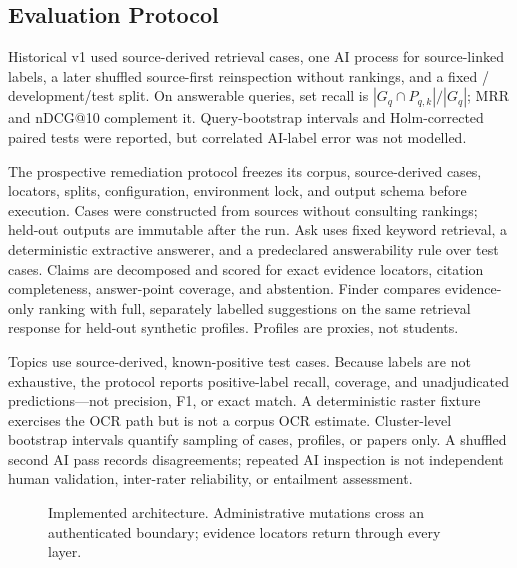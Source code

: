 \documentclass[conference,letterpaper]{IEEEtran}
\begin{document}
\subsection{Evaluation Protocol}
Historical v1 used \PaperRetrievalCaseCount{} source-derived retrieval cases, one AI process for source-linked labels, a later shuffled source-first reinspection without rankings, and a fixed \PaperRetrievalDevCount{}/\PaperRetrievalTestCount{} development/test split. On answerable queries, set recall is $|G_q\cap P_{q,k}|/|G_q|$; MRR and nDCG@10 complement it. Query-bootstrap intervals and Holm-corrected paired tests were reported, but correlated AI-label error was not modelled.

The prospective remediation protocol freezes its corpus, source-derived cases, locators, splits, configuration, environment lock, and output schema before execution. Cases were constructed from sources without consulting rankings; held-out outputs are immutable after the run. Ask uses fixed keyword retrieval, a deterministic extractive answerer, and a predeclared answerability rule over \VTwoQATestCases{} test cases. Claims are decomposed and scored for exact evidence locators, citation completeness, answer-point coverage, and abstention. Finder compares evidence-only ranking with full, separately labelled suggestions on the same retrieval response for \VTwoFinderTestProfiles{} held-out synthetic profiles. Profiles are proxies, not students.

Topics use \VTwoTopicTestCases{} source-derived, known-positive test cases. Because labels are not exhaustive, the protocol reports positive-label recall, coverage, and unadjudicated predictions---not precision, F1, or exact match. A deterministic raster fixture exercises the OCR path but is not a corpus OCR estimate. Cluster-level bootstrap intervals quantify sampling of cases, profiles, or papers only. A shuffled second AI pass records disagreements; repeated AI inspection is not independent human validation, inter-rater reliability, or entailment assessment.

\begin{figure}[t]
\centering
\resizebox{0.96\textwidth}{!}{}
\caption{Implemented architecture. Administrative mutations cross an authenticated boundary; evidence locators return through every layer.}
\label{fig:architecture}
\end{figure}
\end{document}
